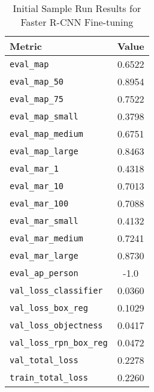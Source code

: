 \begin{table}[!htb]
    \centering
    \caption{Initial Sample Run Results for Faster R-CNN Fine-tuning}
    \label{tab:fasterrcnn_sample_results}
    \begin{tabular}{@{}lc@{}}
        \toprule
        Metric                      & Value   \\ \midrule
        \texttt{eval\_map}           & 0.6522  \\
        \texttt{eval\_map\_50}        & 0.8954  \\
        \texttt{eval\_map\_75}        & 0.7522  \\
        \texttt{eval\_map\_small}     & 0.3798  \\
        \texttt{eval\_map\_medium}    & 0.6751  \\
        \texttt{eval\_map\_large}     & 0.8463  \\
        \texttt{eval\_mar\_1}         & 0.4318  \\
        \texttt{eval\_mar\_10}        & 0.7013  \\
        \texttt{eval\_mar\_100}       & 0.7088  \\
        \texttt{eval\_mar\_small}     & 0.4132  \\
        \texttt{eval\_mar\_medium}    & 0.7241  \\
        \texttt{eval\_mar\_large}     & 0.8730  \\
        \texttt{eval\_ap\_person}     & -1.0    \\
        \texttt{val\_loss\_classifier}& 0.0360  \\
        \texttt{val\_loss\_box\_reg}  & 0.1029  \\
        \texttt{val\_loss\_objectness}& 0.0417  \\
        \texttt{val\_loss\_rpn\_box\_reg}& 0.0472  \\
        \texttt{val\_total\_loss}     & 0.2278  \\
        \texttt{train\_total\_loss}   & 0.2260  \\ \bottomrule
    \end{tabular}
\end{table}

